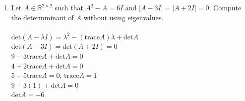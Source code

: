 \documentclass{article}
\begin{document}
{{\begin{enumerate}
\\$Q=\left[\begin{array}{cc}\frac{-1}{\sqrt{2}} & \frac{3\sqrt{2}}{2\sqrt{11}}\\0 & \frac{\sqrt{2}}{\sqrt{11}}\\\frac{1}{\sqrt{2}} & \frac{3\sqrt{2}}{2\sqrt{11}}\end{array}\right]$, $\qquad$ $R=\left[\begin{array}{cc}\sqrt{2} & \frac{-3}{\sqrt{2}} \\ 0 & \sqrt{\frac{11}{2}} \end{array}\right]$
\\$y=Q^Tb$
\\$y_1=q_1^Tb=\frac{-2+2}{\sqrt{2}}=0$
\\$u_2^Tb=\frac{3}{2}*2+1*1+\frac{3}{2}*2=7$
\\$y_2=q_2^Tb=\frac{u_2^Tb}{||u_2||}=\frac{7}{\sqrt{11/2}}$
\\$Rx=y$
\\$\sqrt{\frac{11}{2}}x_2=y_2$, $x_2=\frac{y_2}{\sqrt{11/2}}=\frac{7}{11/2}=\frac{14}{11}$
\\$\sqrt{2}x_1-\frac{3}{\sqrt{2}}x_2=0$, $x_1=\frac{3}{2}x_2=\frac{21}{11}$
\\$x=\left[\begin{array}{c}21/11\\14/11\end{array}\right]$

\newpage\item Let $A\in\mathbb{R}^{2\times 2}$ such that $A^2-A=6I$ and $|A-3I|=|A+2I|=0$. Compute the determminant of $A$ without using eigenvalues.
\\
\\$\textrm{det}(A-\lambda I)=\lambda^2-(\textrm{trace} A)\lambda+\textrm{det}A$
\\$\textrm{det}(A-3I)=\textrm{det}(A+2I)=0$
\\$9-3\textrm{trace}A+\textrm{det}A=0$
\\$4+2\textrm{trace}A+\textrm{det}A=0$
\\$5-5\textrm{trace}A=0$, $\textrm{trace}A=1$
\\$9-3(1)+\textrm{det}A=0$
\\$\textrm{det}A=-6$


\end{enumerate}}}
\end{document}
